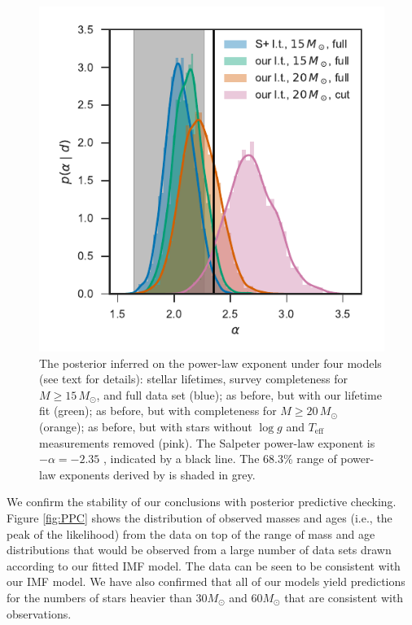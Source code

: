 \documentclass[apjl]{emulateapj}
\newcommand{\MSun}{M_\odot}
\begin{document}
\begin{figure}
\includegraphics[width=\columnwidth]{alpha.pdf}
    		\caption{The posterior inferred on the power-law exponent under four models (see text for details): \citet{Schneider:2018} stellar lifetimes, survey completeness for $M \geq 15 \, \MSun$, and full \citet{Schneider:2018} data set (blue); as before, but with our lifetime fit (green); as before, but with completeness for $M \geq 20 \, \MSun$ (orange); as before, but with stars without $\log g$ and $T_\textrm{eff}$ measurements removed (pink).  The Salpeter power-law exponent is $-\alpha=-2.35$ \citep{Salpeter:1955}, indicated by a black line.  The 68.3\% range of power-law exponents derived by \citet{Schneider:2018} is shaded in grey. }\label{fig:IMF}
\end{figure}

We confirm the stability of our conclusions with posterior predictive checking.
Figure \ref{fig:PPC} shows the distribution of observed masses and ages (i.e.,
the peak of the likelihood) from the \citet{Schneider:2018} data on top of the
range of mass and age distributions that would be observed from a large number
of data sets drawn according to our fitted IMF model.  The data can be seen to
be consistent with our IMF model.  We have also confirmed that all of our models yield predictions for the numbers of stars heavier than $30 M_\odot$ and $60 M_\odot$ that are consistent with observations.
\end{document}
